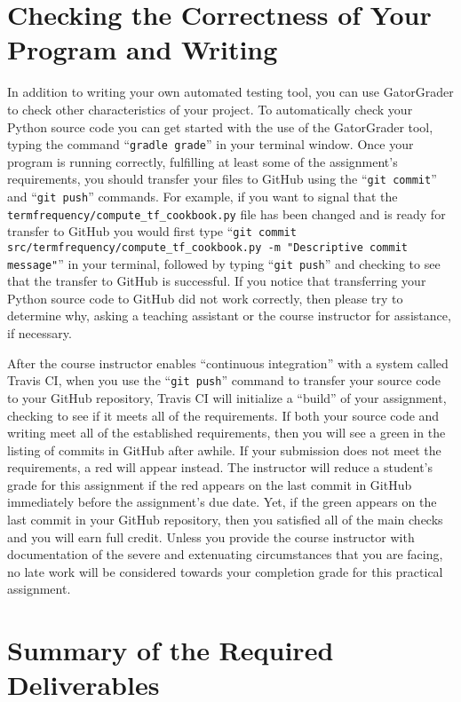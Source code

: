 \documentclass[11pt]{article}
\newcommand{\mainprogramsource}{\lstinline{termfrequency/compute_tf_cookbook.py}}
\newcommand{\gatorgraderstart}{\command{gradle grade}}
\newcommand{\gitcommit}{\command{git commit}}
\newcommand{\gitpush}{\command{git push}}
\newcommand{\gitcommitmainprogram}{\command{git commit src/termfrequency/compute_tf_cookbook.py -m "Descriptive commit message"}}
\newcommand{\command}[1]{``\lstinline{#1}''}
\newcommand{\step}[1]{``{#1}''}
\newcommand{\checkmark}{\ding{51}}
\newcommand{\naughtmark}{\ding{55}}
\begin{document}
\section*{Checking the Correctness of Your Program and Writing}

In addition to writing your own automated testing tool, you can use GatorGrader
to check other characteristics of your project. To automatically check your
Python source code you can get started with the use of the GatorGrader tool,
typing the command \gatorgraderstart{} in your terminal window.
%
Once your program is running correctly, fulfilling at least some of the
assignment's requirements, you should transfer your files to GitHub using the
\gitcommit{} and \gitpush{} commands. For example, if you want to signal that
the \mainprogramsource{} file has been changed and is ready for transfer to
GitHub you would first type \gitcommitmainprogram{} in your terminal, followed
by typing \gitpush{} and checking to see that the transfer to GitHub is
successful. If you notice that transferring your Python source code to GitHub
did not work correctly, then please try to determine why, asking a teaching
assistant or the course instructor for assistance, if necessary.

After the course instructor enables \step{continuous integration} with a system
called Travis CI, when you use the \gitpush{} command to transfer your source
code to your GitHub repository, Travis CI will initialize a \step{build} of your
assignment, checking to see if it meets all of the requirements. If both your
source code and writing meet all of the established requirements, then you will
see a green \checkmark{} in the listing of commits in GitHub after awhile. If
your submission does not meet the requirements, a red \naughtmark{} will appear
instead. The instructor will reduce a student's grade for this assignment if the
red \naughtmark{} appears on the last commit in GitHub immediately before the
assignment's due date. Yet, if the green \checkmark{} appears on the last commit
in your GitHub repository, then you satisfied all of the main checks and you
will earn full credit. Unless you provide the course instructor with
documentation of the severe and extenuating circumstances that you are facing,
no late work will be considered towards your completion grade for this practical
assignment.

\section*{Summary of the Required Deliverables}
\end{document}
